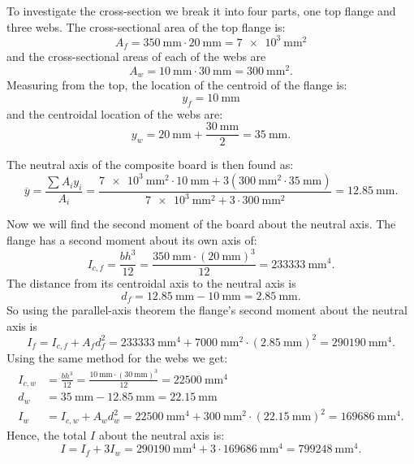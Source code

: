 \begin{derivation}
  To investigate the cross-section we break it into four parts, one top flange and three webs.
  The cross-sectional area of the top flange is:
  \begin{equation*}
    A_f = \qty{350}{\mm} \cdot \qty{20}{\mm} =  \qty{7e3}{\mm^2} 
  \end{equation*}
  and the cross-sectional areas of each of the webs are
  \begin{equation*}
    A_w = \qty{10}{\mm} \cdot \qty{30}{\mm} = \qty{300}{\mm^2} 
  .\end{equation*}
  Measuring from the top, the location of the centroid of the flange is:
  \begin{equation*}
    y_f = \qty{10}{\mm} 
  \end{equation*}
  and the centroidal location of the webs are:
  \begin{equation*}
    y_w = \qty{20}{\mm} + \frac{\qty{30}{\mm} }{2} = \qty{35}{\mm} 
  .\end{equation*}
  
  The neutral axis of the composite board is then found as:
  \begin{equation*}
    \overline{y} = \frac{\sum A_i y_i}{A_i} = \frac{\qty{7e3}{\mm^2} \cdot \qty{10}{\mm} + 3 \left( \qty{300}{\mm^2} \cdot \qty{35}{\mm}  \right)}{\qty{7e3}{\mm^2} + 3 \cdot \qty{300}{\mm^2} } = \qty{12.85}{\mm} 
  .\end{equation*}
  
  Now we will find the second moment of the board about the neutral axis.
  The flange has a second moment about its own axis of:
  \begin{equation*}
    I_{c,f} = \frac{bh^3}{12} = \frac{\qty{350}{\mm} \cdot \left( \qty{20}{\mm}  \right)^3}{12} = \qty{233333}{\mm^4}
  .\end{equation*}
  The distance from its centroidal axis to the neutral axis is
  \begin{equation*}
    d_f = \qty{12.85}{\mm} - \qty{10}{\mm} = \qty{2.85}{\mm} 
  .\end{equation*}
  So using the parallel-axis theorem the flange's second moment about the neutral axis is
  \begin{equation*}
    I_f = I_{c,f} + A_f d_f^2 = \qty{233333}{\mm^{4}} + \qty{7000}{\mm^2} \cdot \left( \qty{2.85}{\mm}  \right)^2 = \qty{290190}{\mm^4}
  .\end{equation*}
  Using the same method for the webs we get:
  \begin{align*}
    I_{c,w} &= \frac{bh^3}{12} =  \frac{\qty{10}{\mm} \cdot \left( \qty{30}{\mm}  \right)^3}{12}  = \qty{22500}{\mm^4} \\
    d_w &= \qty{35}{\mm} - \qty{12.85}{\mm}   = \qty{22,15}{\mm}\\
    I_w &= I_{c,w} + A_w d_w^2 = \qty{22500}{\mm^{4}} + \qty{300}{\mm^2} \cdot \left( \qty{22.15}{\mm}  \right)^2  = \qty{169686}{\mm^4}
  .\end{align*}
  Hence, the total $I$ about the neutral axis is:
  \begin{equation*}
    I = I_f + 3 I_w = \qty{290190}{\mm^{4}} + 3 \cdot \qty{169686}{\mm^{4}}  = \qty{799248}{\mm^4}
  .\end{equation*}


\end{derivation}
